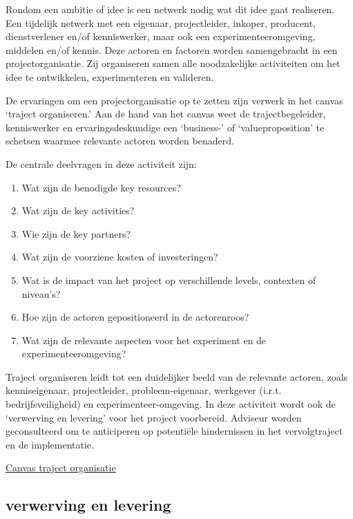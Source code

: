 \documentclass[
]{book}
\providecommand{\tightlist}{%
  \setlength{\itemsep}{0pt}\setlength{\parskip}{0pt}}
\begin{document}
Rondom een ambitie of idee is een netwerk nodig wat dit idee gaat realiseren. Een tijdelijk netwerk met een eigenaar, projectleider, inkoper, producent, dienstverlener en/of kenniswerker, maar ook een experimenteeromgeving, middelen en/of kennis. Deze actoren en factoren worden samengebracht in een projectorganisatie. Zij organiseren samen alle noodzakelijke activiteiten om het idee te ontwikkelen, experimenteren en valideren.

De ervaringen om een projectorganisatie op te zetten zijn verwerk in het canvas `traject organiseren.' Aan de hand van het canvas weet de trajectbegeleider, kenniswerker en ervaringsdeskundige een `business-' of `valueproposition' te schetsen waarmee relevante actoren worden benaderd.

De centrale deelvragen in deze activiteit zijn:

\begin{enumerate}
\def\labelenumi{\arabic{enumi}.}
\tightlist
\item
  Wat zijn de benodigde key resources?
\item
  Wat zijn de key activities?
\item
  Wie zijn de key partners?
\item
  Wat zijn de voorziene kosten of investeringen?
\item
  Wat is de impact van het project op verschillende levels, contexten of niveau's?
\item
  Hoe zijn de actoren gepositioneerd in de actorenroos?
\item
  Wat zijn de relevante aspecten voor het experiment en de experimenteeromgeving?
\end{enumerate}

Traject organiseren leidt tot een duidelijker beeld van de relevante actoren, zoals kenniseigenaar, projectleider, probleem-eigenaar, werkgever (i.r.t. bedrijfsveiligheid) en experimenteer-omgeving. In deze activiteit wordt ook de `verwerving en levering' voor het project voorbereid. Adviseur worden geconsulteerd om te anticiperen op potentiële hindernissen in het vervolgtraject en de implementatie.

\href{data/images/20200116-CDE-canvassen-trajectorganisatie.svg}{Canvas traject organisatie}

\hypertarget{verwerving-en-levering}{%
\subsection{verwerving en levering}\label{verwerving-en-levering}}
\end{document}
